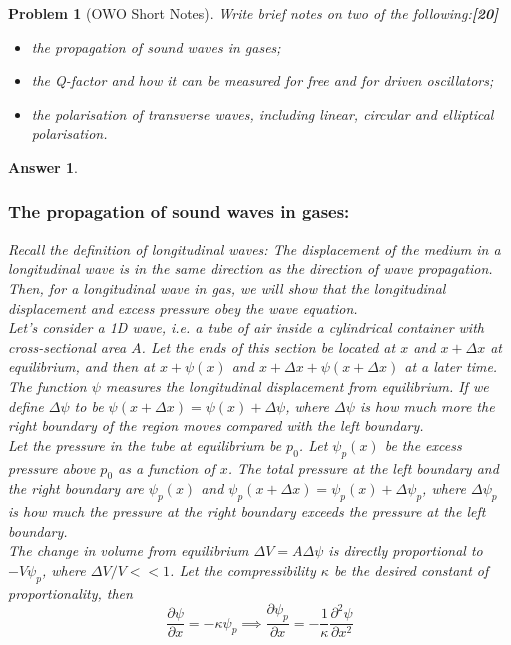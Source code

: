 \documentclass[a4paper]{article}
\newtheorem{ans}{Answer}[subsection]
\theoremstyle{new}
\newtheorem{qns}{Problem}[subsection]
\begin{document}
\newpage
\begin{qns}[OWO Short Notes]
Write brief notes on two of the following:\hfill\textbf{[20]}
\begin{itemize}
    \item the propagation of sound waves in gases;
    \item the Q-factor and how it can be measured for free and for driven oscillators;
    \item the polarisation of transverse waves, including linear, circular and elliptical polarisation.
\end{itemize}
\end{qns}
\begin{ans}\leavevmode
\subsubsection*{The propagation of sound waves in gases:}
Recall the definition of longitudinal waves: The displacement of the medium in a longitudinal wave is in the same direction as the direction of wave propagation. Then, for a longitudinal wave in gas, we will show that the longitudinal displacement and excess pressure obey the wave equation.\\[5pt]
Let's consider a 1D wave, i.e. a tube of air inside a cylindrical container with cross-sectional area $A$. Let the ends of this section be located at $x$ and $x+\Delta x$ at equilibrium, and then at $x+\psi(x)$ and $x+\Delta x+\psi(x+\Delta x)$ at a later time. The function $\psi$ measures the longitudinal displacement from equilibrium. If we define $\Delta\psi$ to be $\psi(x+\Delta x)=\psi(x)+\Delta\psi$, where $\Delta\psi$ is how much more the right boundary of the region moves compared with the left boundary.\\[5pt]
Let the pressure in the tube at equilibrium be $p_0$. Let $\psi_p(x)$ be the excess pressure above $p_0$ as a function of $x$. The total pressure at the left boundary and the right boundary are $\psi_p(x)$ and $\psi_p(x+\Delta x)=\psi_p(x)+\Delta\psi_p$, where $\Delta\psi_p$ is how much the pressure at the right boundary exceeds the pressure at the left boundary.\\[5pt]
The change in volume from equilibrium $\Delta V=A\Delta\psi$ is directly proportional to $-V\psi_p$, where $\Delta V/V<<1$. Let the compressibility $\kappa$ be the desired constant of proportionality, then $$\frac{\partial\psi}{\partial x}=-\kappa\psi_p\implies\frac{\partial\psi_p}{\partial x}=-\frac{1}{\kappa}\frac{\partial^2\psi}{\partial x^2}$$

\end{ans}
\end{document}
